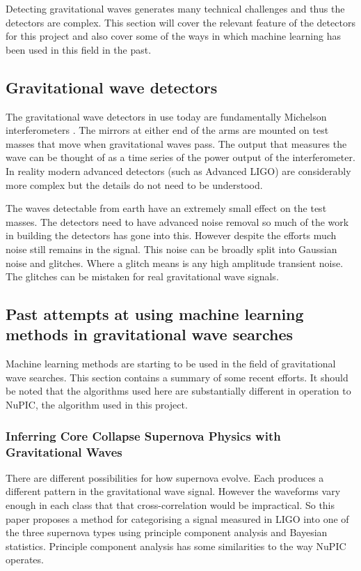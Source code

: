 \documentclass[a4paper]{jpconf}
\begin{document}
Detecting gravitational waves generates many technical challenges and thus the detectors are complex. This section will cover the relevant feature of the detectors for this project and also cover some of the ways in which machine learning has been used in this field in the past.

	\subsection{Gravitational wave detectors}
		The gravitational wave detectors in use today are fundamentally Michelson interferometers \cite{saulson_fundamentals_1994}. The mirrors at either end of the arms are mounted on test masses that move when gravitational waves pass. The output that measures the wave can be thought of as a time series of the power output of the interferometer. In reality modern advanced detectors (such as Advanced LIGO) are considerably more complex but the details do not need to be understood.

	The waves detectable from earth have an extremely small effect on the test masses. The detectors need to have advanced noise removal so much of the work in building the detectors has gone into this. However despite the efforts much noise still remains in the signal. This noise can be broadly split into Gaussian noise and glitches. Where a glitch means is any high amplitude transient noise. The glitches can be mistaken for real gravitational wave signals.

	\subsection{Past attempts at using machine learning methods in gravitational wave searches}
		Machine learning methods are starting to be used in the field of gravitational wave searches. This section contains a summary of some recent efforts. It should be noted that the algorithms used here are substantially different in operation to NuPIC, the algorithm used in this project. %

		\subsubsection*{Inferring Core Collapse Supernova Physics with Gravitational Waves \cite{logue_inferring_2012}}
			There are different possibilities for how supernova evolve. Each produces a different pattern in the gravitational wave signal. However the waveforms vary enough in each class that that cross-correlation would be impractical. So this paper proposes a method for categorising a signal measured in LIGO into one of the three supernova types using principle component analysis and Bayesian statistics. Principle component analysis has some similarities to the way NuPIC operates.
			
\end{document}
